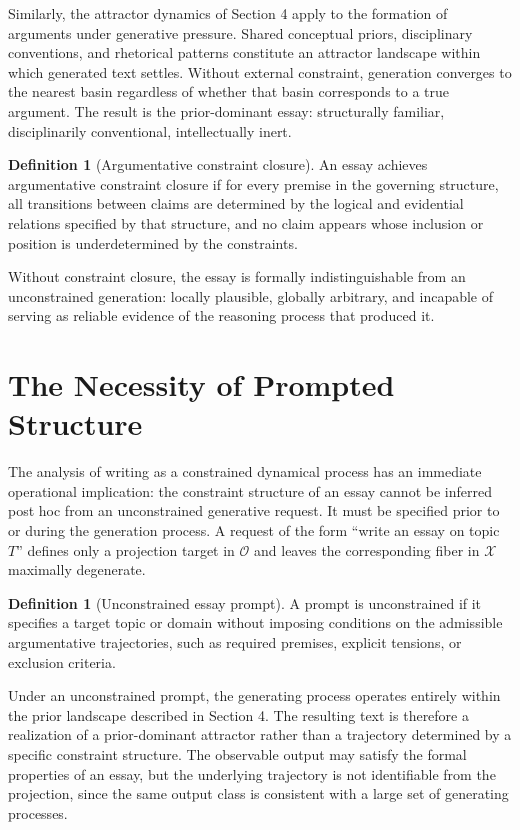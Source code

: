 \documentclass[12pt, oneside]{article}
\theoremstyle{plain}
\theoremstyle{definition}
\newtheorem{definition}[theorem]{Definition}
\theoremstyle{remark}
\newcommand{\config}{\mathcal{X}}
\newcommand{\obs}{\mathcal{O}}
\begin{document}
Similarly, the attractor dynamics of Section 4 apply to the formation of arguments under
generative pressure. Shared conceptual priors, disciplinary conventions, and rhetorical
patterns constitute an attractor landscape within which generated text settles. Without
external constraint, generation converges to the nearest basin regardless of whether that
basin corresponds to a true argument. The result is the prior-dominant essay: structurally
familiar, disciplinarily conventional, intellectually inert.

\begin{definition}[Argumentative constraint closure]
An essay achieves argumentative constraint closure if for every premise in the governing
structure, all transitions between claims are determined by the logical and evidential
relations specified by that structure, and no claim appears whose inclusion or position
is underdetermined by the constraints.
\end{definition}

Without constraint closure, the essay is formally indistinguishable from an unconstrained
generation: locally plausible, globally arbitrary, and incapable of serving as reliable
evidence of the reasoning process that produced it.

\section{The Necessity of Prompted Structure}

The analysis of writing as a constrained dynamical process has an immediate operational
implication: the constraint structure of an essay cannot be inferred post hoc from an
unconstrained generative request. It must be specified prior to or during the generation
process. A request of the form ``write an essay on topic $T$'' defines only a projection
target in $\obs$ and leaves the corresponding fiber in $\config$ maximally degenerate.

\begin{definition}[Unconstrained essay prompt]
A prompt is unconstrained if it specifies a target topic or domain without imposing
conditions on the admissible argumentative trajectories, such as required premises,
explicit tensions, or exclusion criteria.
\end{definition}

Under an unconstrained prompt, the generating process operates entirely within the prior
landscape described in Section 4. The resulting text is therefore a realization of a
prior-dominant attractor rather than a trajectory determined by a specific constraint
structure. The observable output may satisfy the formal properties of an essay, but the
underlying trajectory is not identifiable from the projection, since the same output class
is consistent with a large set of generating processes.
\end{document}
